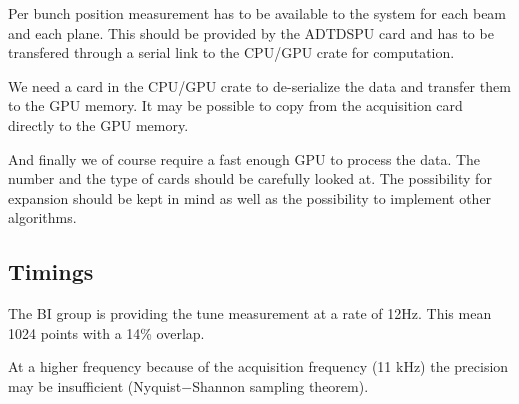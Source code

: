 Per bunch position measurement has to be available to the system for each beam and each plane. This should be provided by the \gls{ADTDSPU} card and has to be transfered through a serial link to the CPU/GPU crate for computation.

We need a card in the CPU/GPU crate to de-serialize the data and transfer them to the GPU memory. It may be possible to copy from the acquisition card directly to the GPU memory.

And finally we of course require a fast enough GPU to process the
data. The number and the type of cards should be carefully looked
at. The possibility for expansion should be kept in mind as well as the
possibility to implement other algorithms.

\subsection{Timings}

The \gls{BI} group is providing the tune measurement at a rate of 12Hz. This mean 1024 points with a 14\% overlap. 

At a higher frequency because of the acquisition frequency (11 kHz) the precision may be insufficient (Nyquist$-$Shannon sampling theorem).